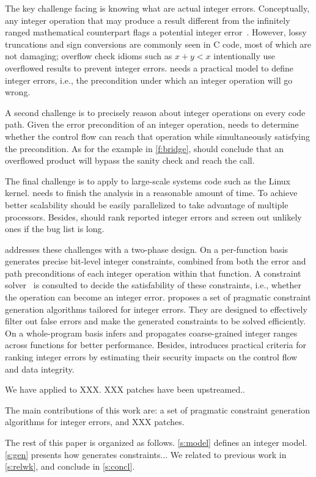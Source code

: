 The key challenge facing \sys is knowing what are actual integer
errors.  Conceptually, any integer operation that may produce a result
different from the infinitely ranged mathematical counterpart flags
a potential integer error~\cite{air}.  However, lossy truncations
and sign conversions are commonly seen in C code, most of which are
not damaging; overflow check idioms such as $x + y < x$ intentionally
use overflowed results to prevent integer errors.  \sys needs a
practical model to define integer errors, i.e., the precondition
under which an integer operation will go wrong.

A second challenge is to precisely reason about integer operations
on every code path.  Given the error precondition of an integer
operation, \sys needs to determine whether the control flow can
reach that operation while simultaneously satisfying the precondition.
As for the example in \autoref{f:bridge}, \sys should conclude that
an overflowed product  will bypass the sanity check and
reach the  call.

The final challenge is to apply \sys to large-scale systems code
such as the Linux kernel.  \sys needs to finish the analysis in a
reasonable amount of time.  To achieve better scalability \sys
should be easily parallelized to take advantage of multiple processors.
Besides, \sys should rank reported integer errors and screen out
unlikely ones if the bug list is long.

\sys addresses these challenges with a two-phase design.
%
On a per-function basis \sys generates precise bit-level integer
constraints, combined from both the error and path preconditions
of each integer operation within that function.  A constraint
solver~\cite{boolector} is consulted to decide the satisfability
of these constraints, i.e., whether the operation can become an
integer error.  \sys proposes a set of pragmatic constraint generation
algorithms tailored for integer errors.  They are designed to
effectively filter out false errors and make the generated constraints
to be solved efficiently.
%
On a whole-program basis \sys infers and propagates coarse-grained
integer ranges across functions for better performance.
%
Besides, \sys introduces practical criteria for ranking integer
errors by estimating their security impacts on the control flow and
data integrity.

We have applied \sys to XXX.  XXX patches have been upstreamed..

The main contributions of this work are: a set of pragmatic constraint
generation algorithms for integer errors, and XXX patches.

The rest of this paper is organized as follows. \autoref{s:model}
defines an integer model.  \autoref{s:gen} presents how \sys generates
constraints...  We related \sys to previous work in \autoref{s:relwk},
and conclude in \autoref{s:concl}.
